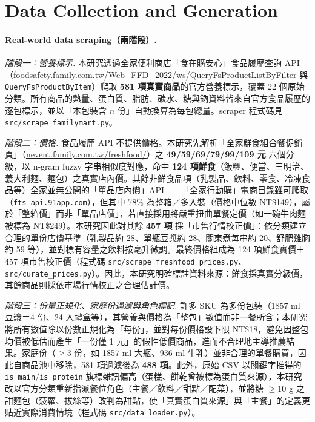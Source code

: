 \documentclass[a4paper]{article}
\begin{document}
\section{Data Collection and Generation}\label{sec:data}
\paragraph{Real-world data scraping（兩階段）.}

\textit{階段一：營養標示.} 本研究透過全家便利商店「食在購安心」食品履歷查詢 API（\url{foodsafety.family.com.tw/Web_FFD_2022/ws/QueryFsProductListByFilter} 與 \texttt{QueryFsProductByItem}）爬取 \textbf{581 項真實商品}的官方營養標示，覆蓋 22 個原始分類。所有商品的熱量、蛋白質、脂肪、碳水、糖與鈉資料皆來自官方食品履歷的逐包標示，並以「本包裝含 $n$ 份」自動換算為每包總量。scraper 程式碼見 \texttt{src/scrape\_familymart.py}。

\textit{階段二：價格.} 食品履歷 API 不提供價格。本研究先解析「全家鮮食組合餐促銷頁」（\url{nevent.family.com.tw/freshfood/}）之 \textbf{49/59/69/79/99/109 元} 六個分級，以 n-gram fuzzy 字串相似度對應，命中 \textbf{124 項鮮食}（飯糰、便當、三明治、義大利麵、麵包）之真實店內價。其餘非鮮食品項（乳製品、飲料、零食、冷凍食品等）全家並無公開的「單品店內價」API——「全家行動購」電商目錄雖可爬取（\texttt{fts-api.91app.com}），但其中 78\% 為整箱／多入裝（價格中位數 NT\$149），屬於「整箱價」而非「單品店價」，若直接採用將嚴重扭曲單餐定價（如一碗牛肉麵被標為 NT\$249）。本研究因此對其餘 \textbf{457 項} 採「市售行情校正價」：依分類建立合理的單份店價基準（乳製品約 28、單瓶豆漿約 28、關東煮每串約 20、舒肥雞胸約 59 等），並對標有容量之飲料按毫升微調。最終價格組成為 124 項鮮食實價＋457 項市售校正價（程式碼 \texttt{src/scrape\_freshfood\_prices.py}、\texttt{src/curate\_prices.py}）。因此，本研究明確標註資料來源：鮮食採真實分級價，其餘商品則採依市場行情校正之合理估計價。

\textit{階段三：份量正規化、家庭份過濾與角色標記.} 許多 SKU 為多份包裝（1857 ml 豆漿＝4 份、24 入禮盒等），其營養與價格為「整包」數值而非一餐所含；本研究將所有數值除以份數正規化為「每份」，並對每份價格設下限 NT\$18，避免因整包均價被低估而產生「一份僅 1 元」的假性低價商品，進而不合理地主導推薦結果。家庭份（$\ge 3$ 份，如 1857 ml 大瓶、936 ml 牛乳）並非合理的單餐購買，因此自商品池中移除，581 項過濾後為 \textbf{488 項}。此外，原始 CSV 以關鍵字推得的 \texttt{is\_main}/\texttt{is\_protein} 旗標雜訊偏高（蛋糕、餅乾曾被標為蛋白質來源），本研究改以官方分類重新指派餐位角色（主餐／飲料／甜點／配菜），並將糖 $\ge 10$ g 之甜麵包（菠蘿、拔絲等）改判為甜點，使「真實蛋白質來源」與「主餐」的定義更貼近實際消費情境（程式碼 \texttt{src/data\_loader.py}）。
\end{document}
